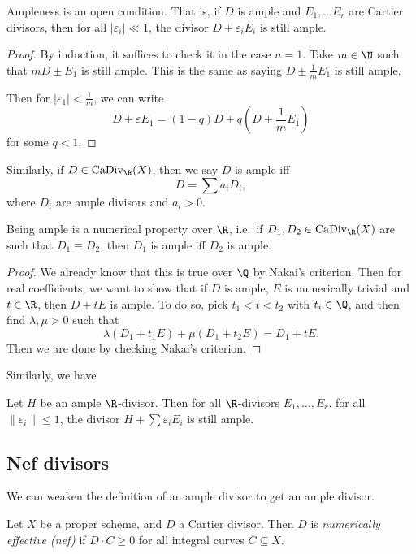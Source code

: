 \documentclass[a4paper]{article}
\newcommand\CaDiv{\mathrm{CaDiv}}
\begin{document}
\begin{prop}
  Ampleness is an open condition. That is, if $D$ is ample and $E_1, \ldots E_r$ are Cartier divisors, then for all $|\varepsilon_i| \ll 1$, the divisor $D + \varepsilon_i E_i$ is still ample.
\end{prop}

\begin{proof}
  By induction, it suffices to check it in the case $n = 1$. Take $m \in \N$ such that $mD \pm E_1$ is still ample. This is the same as saying $D \pm \frac{1}{m} E_1$ is still ample.

  Then for $|\varepsilon_1| < \frac{1}{m}$, we can write
  \[
    D + \varepsilon E_1 = (1 - q) D + q \left(D + \frac{1}{m} E_1\right)
  \]
  for some $q < 1$.
\end{proof}

Similarly, if $D \in \CaDiv_\R(X)$, then we say $D$ is ample iff
\[
  D = \sum a_i D_i,
\]
where $D_i$ are ample divisors and $a_i > 0$.

\begin{prop}
  Being ample is a numerical property over $\R$, i.e.\ if $D_1, D_2 \in \CaDiv_\R(X)$ are such that $D_1 \equiv D_2$, then $D_1$ is ample iff $D_2$ is ample.
\end{prop}

\begin{proof}
  We already know that this is true over $\Q$ by Nakai's criterion. Then for real coefficients, we want to show that if $D$ is ample, $E$ is numerically trivial and $t \in \R$, then $D + tE$ is ample. To do so, pick $t_1 < t < t_2$ with $t_i \in \Q$, and then find $\lambda, \mu > 0$ such that
  \[
    \lambda (D_1 + t_1 E) + \mu (D_1 + t_2 E) = D_1 + t E.
  \]
  Then we are done by checking Nakai's criterion.
\end{proof}

Similarly, we have
\begin{prop}
  Let $H$ be an ample $\R$-divisor. Then for all $\R$-divisors $E_1, \ldots, E_r$, for all $\|\varepsilon_i\| \leq 1$, the divisor $H + \sum \varepsilon_i E_i$ is still ample.\fakeqed
\end{prop}

\subsection{Nef divisors}
We can weaken the definition of an ample divisor to get an ample divisor.

\begin{defi}
  Let $X$ be a proper scheme, and $D$ a Cartier divisor. Then $D$ is \emph{numerically effective (nef)} if $D \cdot C \geq 0$ for all integral curves $C \subseteq X$.
\end{defi}
\end{document}
